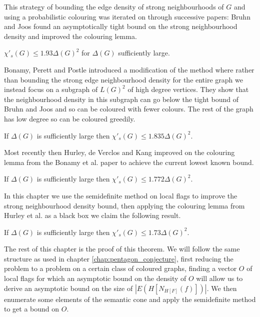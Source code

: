 This strategy of bounding the edge density of strong neighbourhoods of $G$ and
using a probabilistic colouring was iterated on through successive papers:
Bruhn and Joos found an asymptotically tight bound on the strong neighbourhood density
and improved the colouring lemma.
\begin{knowntheorem}
    $\chi'_s(G) \leq 1.93\Delta(G)^2$ for $\Delta(G)$ sufficiently large.
\end{knowntheorem}
Bonamy, Perett and Postle introduced a modification of the method where rather than
bounding the strong edge neighbourhood density for the entire graph we instead focus
on a subgraph of $L(G)^2$ of high degree vertices. They show that the
neighbourhood density in this subgraph can go below the tight bound of Bruhn and Joos
and so can be coloured with fewer colours. The rest of the graph has low degree so can
be coloured greedily.

\begin{knowntheorem}
    If $\Delta(G)$ is sufficiently large then
    $\chi'_s(G) \leq 1.835\Delta(G)^2$.
\end{knowntheorem}

Most recently then Hurley, de Verclos and Kang improved on the colouring lemma from the
Bonamy et al. paper to achieve the current lowest known bound.
\begin{knowntheorem}
    If $\Delta(G)$ is sufficiently large then
    $\chi'_s(G) \leq 1.772\Delta(G)^2$.
\end{knowntheorem}

In this chapter we use the semidefinite method on local flags to improve the strong
neighbourhood density bound, then applying the colouring lemma from Hurley et al. as a black
box we claim the following result.

\begin{theorem}
    \label{thm:strong_edge_colouring_bound}
    If $\Delta(G)$ is sufficiently large then $\chi'_s(G) \leq 1.73\Delta(G)^2$.
\end{theorem}

The rest of this chapter is the proof of this theorem.
We will follow the same structure as used in chapter \ref{chap:pentagon_conjecture},
first reducing the problem to a problem on a certain class of coloured graphs,
finding a vector $O$ of local flags for which an asymptotic bound on the density of $O$ will allow
us to derive an asymptotic bound on the size of $|E(H[N_{H[F]}(f)])|$.
We then enumerate some elements
of the semantic cone and apply the semidefinite method to get a bound on $O$.

